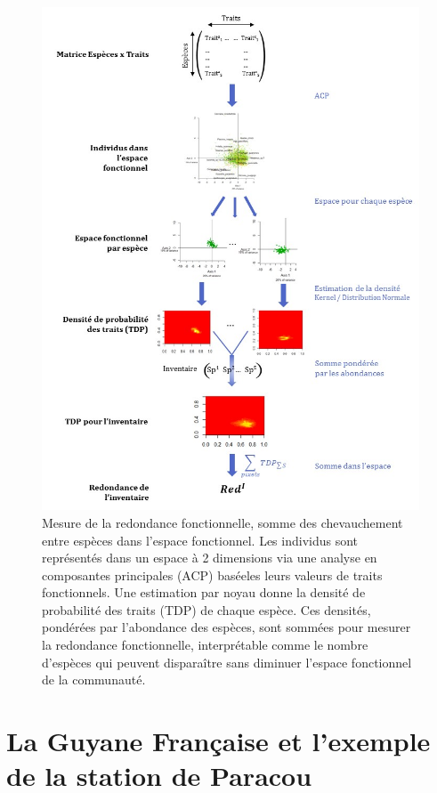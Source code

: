\documentclass[
  11pt,
  french,
  A4paper,
  extrafontsizes,onecolumn,openright
  ]{memoir}
\begin{document}
\begin{figure}

{\centering \includegraphics[width=1\linewidth]{ExternalFig/Fig_MesureRedondance} 

}

\caption{Mesure de la redondance fonctionnelle, somme des chevauchement entre espèces dans l'espace fonctionnel. Les individus sont représentés dans un espace à 2 dimensions via une analyse en composantes principales (ACP) baséeles leurs valeurs de traits fonctionnels. Une estimation par noyau donne la densité de probabilité des traits (TDP) de chaque espèce. Ces densités, pondérées par l'abondance des espèces, sont sommées pour mesurer la redondance fonctionnelle, interprétable comme le nombre d'espèces qui peuvent disparaître sans diminuer l'espace fonctionnel de la communauté.}\label{fig:RedundancyMethod}
\end{figure}

\section{La Guyane Française et l'exemple de la station de
Paracou}\label{la-guyane-francaise-et-lexemple-de-la-station-de-paracou}
\end{document}

